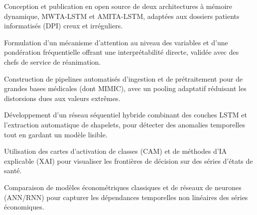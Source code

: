 \begin{cvitems}
  \item Conception et publication en open source de deux architectures à mémoire dynamique, MWTA-LSTM et AMITA-LSTM, adaptées aux dossiers patients informatisés (DPI) creux et irréguliers.
  \item Formulation d’un mécanisme d’attention au niveau des variables et d’une pondération fréquentielle offrant une interprétabilité directe, validée avec des chefs de service de réanimation.
  \item Construction de pipelines automatisés d’ingestion et de prétraitement pour de grandes bases médicales (dont MIMIC), avec un pooling adaptatif réduisant les distorsions dues aux valeurs extrêmes.
\end{cvitems}

\begin{cvitems}
  \item Développement d’un réseau séquentiel hybride combinant des couches LSTM et l’extraction automatique de shapelets, pour détecter des anomalies temporelles tout en gardant un modèle lisible.
  \item Utilisation des cartes d’activation de classes (CAM) et de méthodes d’IA explicable (XAI) pour visualiser les frontières de décision sur des séries d’états de santé.
\end{cvitems}

\begin{cvitems}
  \item Comparaison de modèles économétriques classiques et de réseaux de neurones (ANN/RNN) pour capturer les dépendances temporelles non linéaires des séries économiques.
\end{cvitems}

